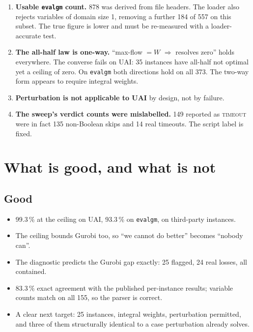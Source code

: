 \documentclass[11pt,a4paper]{article}
\begin{document}
\begin{enumerate}[leftmargin=1.6em]
\item \textbf{Usable \texttt{evalgm} count.} 878 was derived from file headers. The loader also
      rejects variables of domain size 1, removing a further 184 of 557 on this subset. The true
      figure is lower and must be re-measured with a loader-accurate test.
\item \textbf{The all-half law is one-way.} ``max-flow $=W$ $\Rightarrow$ resolves zero'' holds
      everywhere. The converse fails on UAI: 35 instances have all-half not optimal yet a ceiling of
      zero. On \texttt{evalgm} both directions hold on all 373. The two-way form appears to require
      integral weights.
\item \textbf{Perturbation is not applicable to UAI} by design, not by failure.
\item \textbf{The sweep's verdict counts were mislabelled.} 149 reported as \textsc{timeout} were in
      fact 135 non-Boolean skips and 14 real timeouts. The script label is fixed.
\end{enumerate}

\section{What is good, and what is not}

\subsection*{Good}
\begin{itemize}[leftmargin=1.4em]
\item 99.3\,\% at the ceiling on UAI, 93.3\,\% on \texttt{evalgm}, on third-party instances.
\item The ceiling bounds Gurobi too, so ``we cannot do better'' becomes ``nobody can''.
\item The diagnostic predicts the Gurobi gap exactly: 25 flagged, 24 real losses, all contained.
\item 83.3\,\% exact agreement with the published per-instance results; variable counts match on
      all 155, so the parser is correct.
\item A clear next target: 25 instances, integral weights, perturbation permitted, and three of
      them structurally identical to a case perturbation already solves.
\end{itemize}
\end{document}
